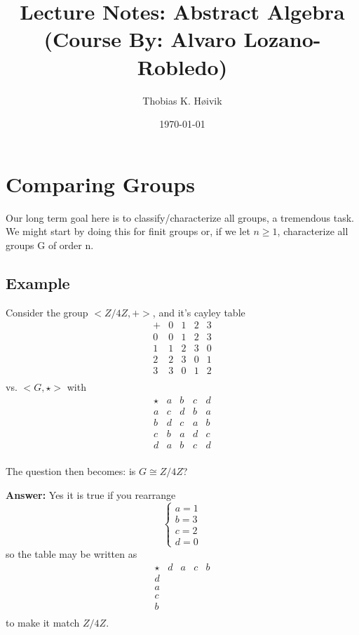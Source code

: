 \documentclass[12pt]{article}
\title{Lecture Notes: Abstract Algebra (Course By: Alvaro Lozano-Robledo)}
\author{Thobias K. Høivik}
\date{\today}
\begin{document}
\maketitle
\section*{Comparing Groups}
Our long term goal here is to classify/characterize all groups, a tremendous task. 
We might start by doing this for finit groups or, if we let \(n \ge 1\), characterize 
all groups G of order n. 

\subsection*{Example} 
Consider the group \(<Z/4Z, +>\), and it's cayley table
\[
\begin{array}{c|cccc}
+ & 0 & 1 & 2 & 3 \\
\hline
0 & 0 & 1 & 2 & 3 \\
1 & 1 & 2 & 3 & 0 \\
2 & 2 & 3 & 0 & 1 \\
3 & 3 & 0 & 1 & 2 \\
\end{array}
\]
vs. \(<G, \star>\) with 
\[
\begin{array}{c|cccc}
\star & a & b & c & d \\
\hline
a & c & d & b & a \\
b & d & c & a & b \\
c & b & a & d & c \\
d & a & b & c & d \\
\end{array}
\]

\noindent 
The question then becomes: is \(G \cong Z/4Z\)? 

\noindent 
\textbf{Answer:} Yes it is true if you rearrange 
\[
\begin{cases} 
a = 1 \\
b = 3 \\ 
c = 2 \\ 
d = 0
\end{cases}
\]
so the table may be written as 
\[
\begin{array}{c|cccc}
\star & d & a & c & b \\
\hline
d &  &  &  &  \\
a &  &  &  &  \\
c &  &  &  &  \\
b &  &  &  &  \\
\end{array}
\]
to make it match \(Z/4Z\).
\end{document}
